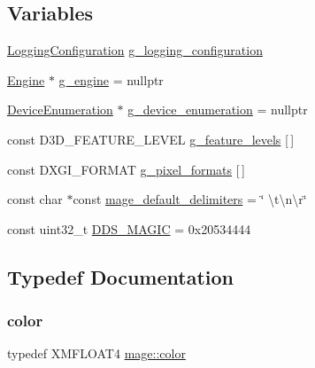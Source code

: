 \subsection*{Variables}
\begin{DoxyCompactItemize}
\item 
\hyperlink{structmage_1_1_logging_configuration}{Logging\+Configuration} \hyperlink{namespacemage_a162413669f92d91c7ee135d60f93fcf1}{g\+\_\+logging\+\_\+configuration}
\item 
\hyperlink{classmage_1_1_engine}{Engine} $\ast$ \hyperlink{namespacemage_a84bf83f1e8779d884452cdf08f56c19a}{g\+\_\+engine} = nullptr
\item 
\hyperlink{classmage_1_1_device_enumeration}{Device\+Enumeration} $\ast$ \hyperlink{namespacemage_a73e54b9b368875ed0281ced59e2fca7e}{g\+\_\+device\+\_\+enumeration} = nullptr
\item 
const D3\+D\+\_\+\+F\+E\+A\+T\+U\+R\+E\+\_\+\+L\+E\+V\+EL \hyperlink{namespacemage_add3b7e051df553262371e077d9d66fd9}{g\+\_\+feature\+\_\+levels} \mbox{[}$\,$\mbox{]}
\item 
const D\+X\+G\+I\+\_\+\+F\+O\+R\+M\+AT \hyperlink{namespacemage_a5a4e11b65061c618b85826ab6df480e0}{g\+\_\+pixel\+\_\+formats} \mbox{[}$\,$\mbox{]}
\item 
const char $\ast$const \hyperlink{namespacemage_ae247ad66af37a4b0d67ddca9404ca01a}{mage\+\_\+default\+\_\+delimiters} = \char`\"{} \textbackslash{}t\textbackslash{}n\textbackslash{}r\char`\"{}
\item 
const uint32\+\_\+t \hyperlink{namespacemage_a52f784e41b51fee843891c6b5e9be479}{D\+D\+S\+\_\+\+M\+A\+G\+IC} = 0x20534444
\end{DoxyCompactItemize}


\subsection{Typedef Documentation}
\hypertarget{namespacemage_a56eceea5a9bceb2b56073f3ea4945781}{}\label{namespacemage_a56eceea5a9bceb2b56073f3ea4945781} 
\subsubsection{\texorpdfstring{color}{color}}
{\footnotesize\ttfamily typedef X\+M\+F\+L\+O\+A\+T4 \hyperlink{namespacemage_a56eceea5a9bceb2b56073f3ea4945781}{mage\+::color}}

\hypertarget{namespacemage_ae74f374780900893caa5555d1031fd79}{}\label{namespacemage_ae74f374780900893caa5555d1031fd79} 
